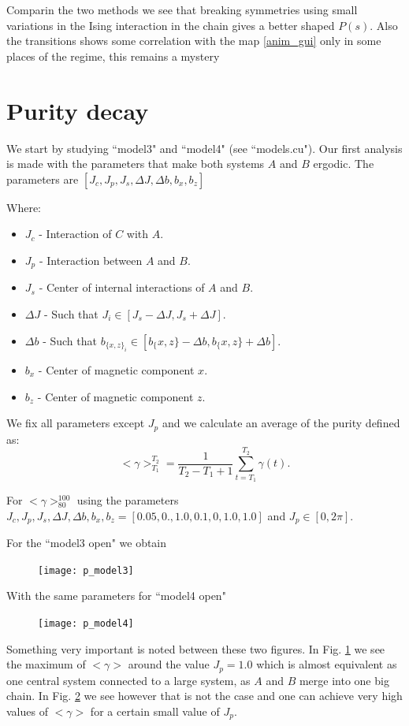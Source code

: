 \documentclass[floatfix]{article}
\newcommand*{\ud}{
\underline{\space\space}}
\begin{document}
Comparin the two methods we see that breaking symmetries using small variations in the Ising interaction in the chain gives
a better shaped $P(s)$. Also the transitions shows some correlation with the map \ref{anim_gui} only in some places of the
regime, this remains a mystery


\section{Purity decay}

We start by studying ``model3" and ``model4" (see ``models.cu"). Our first analysis is made with the parameters that make 
both systems $A$ and $B$ ergodic. The parameters are $[J_c,J_p,J_s,\Delta J,\Delta b, b_x, b_z]$

Where:
\begin{itemize}
\item $J_c$ - Interaction of $C$ with $A$.
\item $J_p$ - Interaction between $A$ and $B$.
\item $J_s$ - Center of internal interactions of $A$ and $B$.
\item $\Delta J$ - Such that $J_i \in [J_s - \Delta J, J_s + \Delta J]$.
\item $\Delta b$ - Such that $b_{{\{x,z\}}_i} \in [b_\{x,z\} - \Delta b, b_\{x,z\} + \Delta b]$.
\item $b_x$ - Center of magnetic component $x$.
\item $b_z$ - Center of magnetic component $z$. 
\end{itemize}

We fix all parameters except $J_p$ and we calculate an average of the purity defined as:
\begin{equation}
<\gamma>_{T_1}^{T_2} = \frac{1}{T_2-T_1+1} \sum_{t=T_1}^{T_2} \gamma(t).
\end{equation}

For $<\gamma>_{80}^{100}$ using the parameters $J_c,J_p,J_s,\Delta J,\Delta b,b_x,b_z=[0.05,0.,1.0,0.1,0,1.0,1.0] $ 
and $J_p \in [0,2\pi]$.

For the ``model3\ud open" we obtain

\begin{figure}[H]
\begin{center}
\texttt{[image: p\_model3]}  
\end{center}
\caption{}
\label{p_m3}
\end{figure}




With the same parameters for ``model4\ud open"

\begin{figure}[H]
\begin{center}
\texttt{[image: p\_model4]}  
\end{center}
\caption{}
\label{p_m4}
\end{figure}

Something very important is noted between these two figures. In Fig. \ref{p_m3} we see the maximum of $<\gamma>$ around
the value $J_p=1.0$ which is almost equivalent as one central system connected to a large system, as $A$ and $B$ merge into one big chain.
In Fig. \ref{p_m4} we see however that is not the case and one can achieve very high values of $<\gamma>$ for a certain small value of 
$J_p$.
\end{document}
